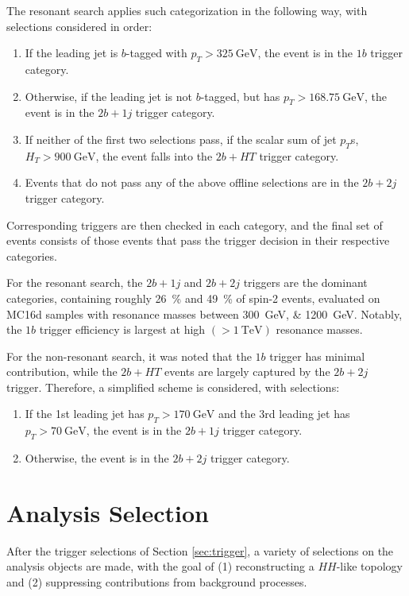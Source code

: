 The resonant search applies such categorization in the following way, with 
selections considered in order:
\begin{enumerate}
	\item If the leading jet is $b$-tagged with $p_{T} > \SI{325}{\GeV}$, the event is in the $1b$ trigger category.
	\item Otherwise, if the leading jet is not $b$-tagged, but has $p_{T} > \SI{168.75}{\GeV}$, the event is in the $2b+1j$
	trigger category.
	\item If neither of the first two selections pass, if the scalar sum of jet $p_{T}$s, $H_{T} > \SI{900}{\GeV}$,
	the event falls into the $2b+HT$ trigger category.
	\item Events that do not pass any of the above offline selections are in the $2b+2j$ trigger category.
\end{enumerate}
Corresponding triggers are then checked in each category, and the final set of events consists of those events that 
pass the trigger decision in their respective categories. 

For the resonant search, the $2b+1j$ and $2b+2j$ triggers are the dominant categories, containing roughly 26~\% and
49~\% of spin-2 events, evaluated on MC16d samples with resonance masses between \SIlist{300;1200}{\GeV}. Notably, 
the $1b$ trigger efficiency is largest at high $(>\SI{1}{\TeV})$ resonance masses.

For the non-resonant search, it was noted that the $1b$ trigger has minimal contribution, while the $2b+HT$ events are 
largely captured by the $2b+2j$ trigger. Therefore, a simplified scheme is considered, 
with selections:
\begin{enumerate}
	\item If the 1st leading jet has $p_{T} > \SI{170}{\GeV}$ and the 3rd leading jet has $p_{T} > \SI{70}{\GeV}$,
	the event is in the $2b+1j$ trigger category.
	\item Otherwise, the event is in the $2b+2j$ trigger category.
\end{enumerate}


\section{Analysis Selection}
\label{sec:analysis-selection}
After the trigger selections of Section \ref{sec:trigger}, a variety of selections on the analysis objects
are made, with the goal of (1) reconstructing a $HH$-like topology and (2) suppressing contributions from 
background processes. 

